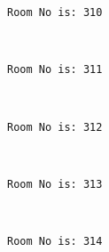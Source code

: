 \documentclass[11pt]{article}
\begin{document}
    \begin{Verbatim}[commandchars=\\\{\}]
Room No is: 310

    \end{Verbatim}

    \begin{center}
    \end{center}
    { \hspace*{\fill} \\}
    
    \begin{Verbatim}[commandchars=\\\{\}]
Room No is: 311

    \end{Verbatim}

    \begin{center}
    \end{center}
    { \hspace*{\fill} \\}
    
    \begin{Verbatim}[commandchars=\\\{\}]
Room No is: 312

    \end{Verbatim}

    \begin{center}
    \end{center}
    { \hspace*{\fill} \\}
    
    \begin{Verbatim}[commandchars=\\\{\}]
Room No is: 313

    \end{Verbatim}

    \begin{center}
    \end{center}
    { \hspace*{\fill} \\}
    
    \begin{Verbatim}[commandchars=\\\{\}]
Room No is: 314

    \end{Verbatim}
\end{document}
